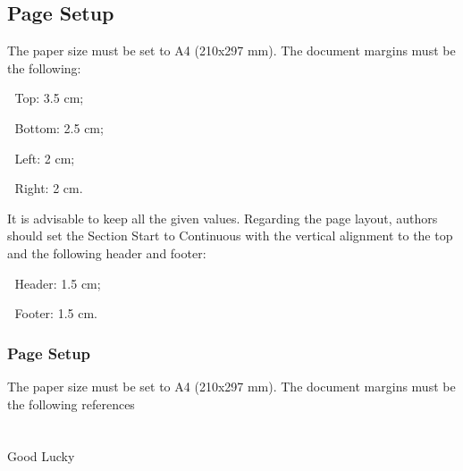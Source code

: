 \documentclass[final,3p]{CSP}
\begin{document}
\subsection{Page Setup}
\noindent
The paper size must be set to A4 (210x297 mm). The document margins must be the following:

	Top: 3.5 cm;

	Bottom: 2.5 cm;

	Left: 2 cm;

	Right: 2 cm.

It is advisable to keep all the given values.
Regarding the page layout, authors should set the Section Start to Continuous with the vertical alignment to the top and the following header and footer:

	Header: 1.5 cm;

	Footer: 1.5 cm.

\subsubsection{Page Setup}
\noindent
The paper size must be set to A4 (210x297 mm). The document margins must be the following
references
\it



 \appendix

 \section{}
 \label{}
Good Lucky
\end{document}
